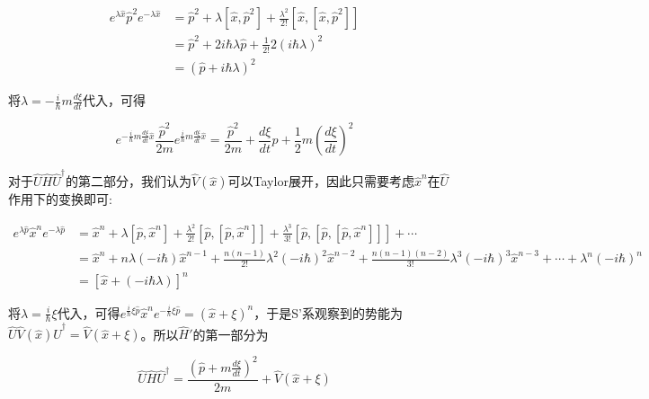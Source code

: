 \documentclass[a4paper]{article}
\begin{document}
        \begin{equation}
            \begin{split}
                e^{\lambda\hat{x}}\hat{p}^2e^{-\lambda\hat{x}} &= \hat{p}^2+\lambda[\hat{x},\hat{p}^2]+\frac{\lambda^2}{2!}[\hat{x},[\hat{x},\hat{p}^2]] \\
                    &= \hat{p}^2+2i\hbar\lambda\hat{p}+\frac{1}{2!}2(i\hbar\lambda)^2 \\
                    &= (\hat{p}+i\hbar\lambda)^2
            \end{split}
        \end{equation}

        将$\lambda=-\frac{i}{\hbar}m\frac{d\xi}{dt}$代入，可得

        \begin{equation}
            e^{-\frac{i}{\hbar}m\frac{d\xi}{dt}\hat{x}}\frac{\hat{p}^2}{2m}e^{\frac{i}{\hbar}m\frac{d\xi}{dt}\hat{x}} = \frac{\hat{p}^2}{2m}+\frac{d\xi}{dt}\hat{p}+\frac{1}{2}m(\frac{d\xi}{dt})^2
        \end{equation}

        对于$\hat{U}\hat{H}\hat{U}^\dagger$的第二部分，我们认为$\hat{V}(\hat{x})$可以Taylor展开，因此只需要考虑$\hat{x}^n$在$\hat{U}$作用下的变换即可:

        \begin{equation}
            \begin{split}
                e^{\lambda\hat{p}}\hat{x}^ne^{-\lambda\hat{p}} &= \hat{x}^n+\lambda[\hat{p},\hat{x}^n]+\frac{\lambda^2}{2!}[\hat{p},[\hat{p},\hat{x}^n]]+\frac{\lambda^3}{3!}[\hat{p},[\hat{p},[\hat{p},\hat{x}^n]]]+\cdots \\
                    &= \hat{x}^n+n\lambda(-i\hbar)\hat{x}^{n-1}+\frac{n(n-1)}{2!}\lambda^2(-i\hbar)^2\hat{x}^{n-2}+\frac{n(n-1)(n-2)}{3!}\lambda^3(-i\hbar)^3\hat{x}^{n-3}+\cdots+\lambda^n(-i\hbar)^n \\
                    &= [\hat{x}+(-i\hbar\lambda)]^n
            \end{split}
        \end{equation}

        将$\lambda=\frac{i}{\hbar}\xi$代入，可得$e^{\frac{i}{\hbar}\xi\hat{p}}\hat{x}^ne^{-\frac{i}{\hbar}\xi\hat{p}}=(\hat{x}+\xi)^n$，于是S'系观察到的势能为$\hat{U}\hat{V}(\hat{x})\hat{U}^\dagger=\hat{V}(\hat{x}+\xi)$。所以$\hat{H}'$的第一部分为

        \begin{equation}
            \hat{U}\hat{H}\hat{U}^\dagger = \frac{(\hat{p}+m\frac{d\xi}{dt})^2}{2m}+\hat{V}(\hat{x}+\xi)
        \end{equation}
\end{document}
